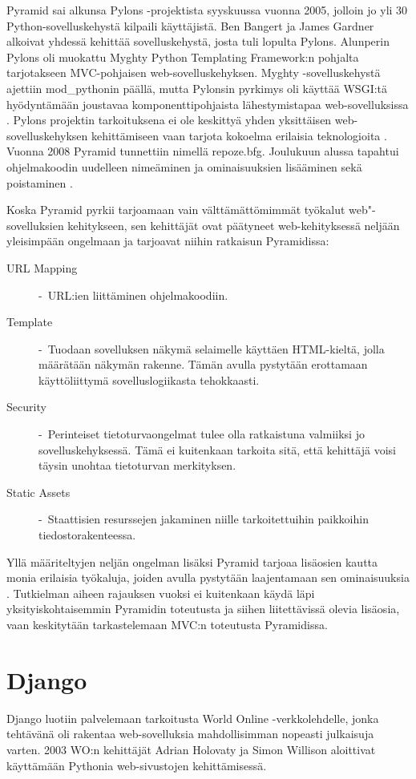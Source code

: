 \documentclass[utf8]{gradu3}
\begin{document}
Pyramid sai alkunsa Pylons -projektista syyskuussa vuonna 2005, jolloin jo yli 30 Python-sovelluskehystä kilpaili käyttäjistä. Ben Bangert ja James Gardner alkoivat yhdessä kehittää sovelluskehystä, josta tuli lopulta Pylons. Alunperin Pylons oli
muokattu Myghty Python Templating Framework:n pohjalta tarjotakseen MVC-pohjaisen web-sovelluskehyksen. Myghty -sovelluskehystä ajettiin mod\_pythonin päällä, mutta Pylonsin pyrkimys oli käyttää WSGI:tä hyödyntämään joustavaa komponenttipohjaista lähestymistapaa web-sovelluksissa \parencite{pyramid_history}. Pylons projektin tarkoituksena ei ole keskittyä yhden yksittäisen web-sovelluskehyksen kehittämiseen vaan tarjota kokoelma erilaisia teknologioita \parencite{pylons_about}. Vuonna 2008 Pyramid tunnettiin nimellä repoze.bfg. Joulukuun alussa tapahtui ohjelmakoodin uudelleen nimeäminen ja ominaisuuksien lisääminen sekä poistaminen \parencite{pyramid_about}.


Koska Pyramid pyrkii tarjoamaan vain välttämättömimmät työkalut web"-sovelluksien kehitykseen, sen kehittäjät
ovat päätyneet web-kehityksessä neljään yleisimpään ongelmaan ja tarjoavat niihin ratkaisun Pyramidissa:

\begin{description}
\item [URL Mapping] -\ URL:ien liittäminen ohjelmakoodiin.
\item[Template] -\ Tuodaan sovelluksen näkymä selaimelle käyttäen HTML-kieltä, jolla määrätään näkymän rakenne. Tämän avulla pystytään erottamaan käyttöliittymä sovelluslogiikasta tehokkaasti.
\item[Security] -\ Perinteiset tietoturvaongelmat tulee olla ratkaistuna valmiiksi jo sovelluskehyksessä. Tämä ei kuitenkaan tarkoita sitä, että kehittäjä voisi täysin unohtaa tietoturvan merkityksen.
\item[Static Assets] -\ Staattisien resurssejen jakaminen niille tarkoitettuihin paikkoihin tiedostorakenteessa.
\end{description}
Yllä määriteltyjen neljän ongelman lisäksi Pyramid tarjoaa lisäosien kautta monia erilaisia työkaluja, joiden avulla pystytään laajentamaan sen ominaisuuksia \parencite{pyramid_intr}. Tutkielman aiheen rajauksen vuoksi ei kuitenkaan
käydä läpi yksityiskohtaisemmin Pyramidin toteutusta ja siihen liitettävissä olevia lisäosia, vaan keskitytään tarkastelemaan MVC:n toteutusta Pyramidissa.

\section{Django}
Django luotiin palvelemaan tarkoitusta  World Online -verkkolehdelle, jonka tehtävänä oli rakentaa web-sovelluksia mahdollisimman nopeasti julkaisuja varten. 2003 WO:n kehittäjät Adrian Holovaty ja Simon Willison aloittivat käyttämään Pythonia web-sivustojen kehittämisessä.  
\end{document}
